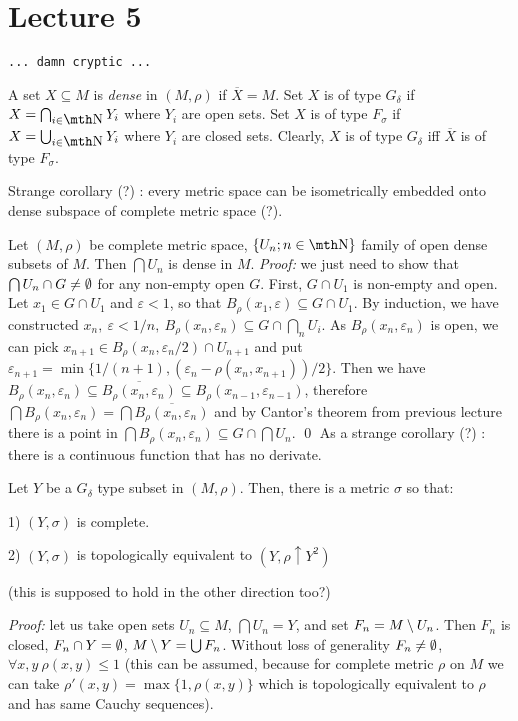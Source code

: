 \chapter{Lecture 5}
\centerline{\tt ... damn cryptic ...}

 A set $X\subseteq M$ is {\it dense} in $(M,\rho)$ if $
\overline X = M$. Set $X$ is of type $G_\delta$ if $X=\bigcap
_{i\in \N} Y_i$ where $Y_i$ are open sets. Set $X$ is of type $F_\sigma$ 
if $X=\bigcup_{i\in \N} Y_i$ where $Y_i$ are closed sets. Clearly, 
$X$ is of type $G_\delta$ iff $\overline X$ is of type $F_\sigma$.

\smallskip Strange corollary (?) : every metric space can be isometrically 
embedded onto dense subspace of complete metric space (?).

\medskip

 Let $(M,\rho)$ be complete metric space, $\{U_n; n\in 
\N\}$ family of open dense subsets of $M$. Then $\bigcap U_n$ is dense 
in $M$.
\smallskip
{\it Proof:} we just need to show that $\bigcap U_n \cap G \neq \emptyset$ 
for any non-empty open $G$. First, $G\cap U_1$ is non-empty and open.
Let $x_1\in G\cap U_1$ and $\varepsilon < 1$, so that $B_\rho (x_1,
\varepsilon) \subseteq G\cap U_1$. By induction, we have constructed 
$x_n,\ \varepsilon < 1/n,\ B_\rho(x_n,\varepsilon_n)\subseteq G\cap 
\bigcap_n U_i$. As $B_\rho(x_n,\varepsilon_n)$ is open, we can pick
$x_{n+1}\in B_\rho(x_n,\varepsilon_n/2)\cap U_{n+1}$ and put $\varepsilon_
{n+1} = \min\{1/(n+1),(\varepsilon_n - \rho(x_n,x_{n+1}))/2\}$. Then we 
have $B_\rho(x_n, \varepsilon_n)\subseteq \overline{B_\rho(x_n,\varepsilon_n)}
\subseteq B_\rho(x_{n-1},\varepsilon_{n-1})$, therefore $\bigcap B_\rho
(x_n,\varepsilon_n) = \bigcap \overline{B_\rho(x_n,\varepsilon_n)}$ and 
by Cantor's theorem from previous lecture there is a point in $\bigcap 
B_\rho(x_n,\varepsilon_n) \subseteq G\cap \bigcap U_n$.
\qed \smallskip
As a strange corollary (?) : there is a continuous function that has no 
derivate.

\medskip

Let $Y$ be a $G_\delta$ type subset in $(M,\rho)$. Then, there is a 
metric $\sigma$ so that:
{\parindent0.5in\parskip6pt
	\item{1)} $(Y,\sigma)$ is complete.
	\item{2)} $(Y,\sigma)$ is topologically equivalent to $(Y,\rho\uparrow
		Y^2)$

}

(this is supposed to hold in the other direction too?)

{\it Proof:} let us take open sets $U_n\subseteq M$, $\bigcap U_n = Y$, and 
set $F_n = M\setminus U_n$. Then $F_n$ is closed, $F_n\cap Y = \emptyset$, $M\setminus Y = 
\bigcup F_n$. Without loss of generality $F_n \neq \emptyset$, $\forall x,y\ 
\rho(x,y) \leq 1$ (this can be assumed, because for complete metric $\rho$ 
on $M$ we can take $\rho'(x,y) = \max\{1,\rho(x,y)\}$ which is topologically 
equivalent to $\rho$ and has same Cauchy sequences).

